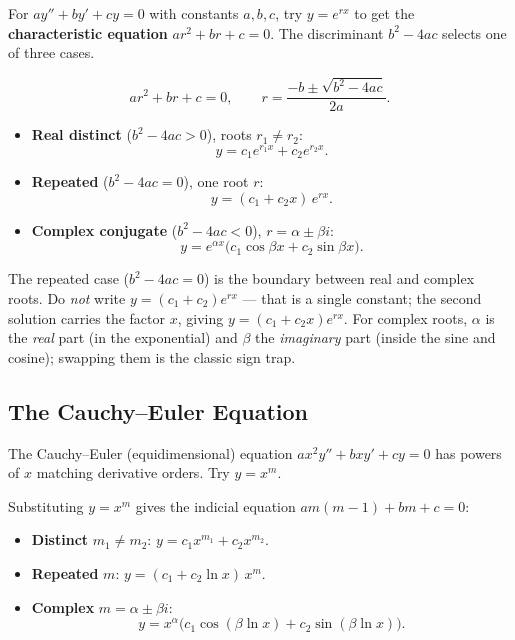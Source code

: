 For $ay'' + by' + cy = 0$ with constants $a,b,c$, try $y=e^{rx}$ to get the
\textbf{characteristic equation} $ar^2 + br + c = 0$. The discriminant
$b^2-4ac$ selects one of three cases.

\begin{formulabox}
\[ ar^2 + br + c = 0, \qquad r = \frac{-b \pm \sqrt{b^2 - 4ac}}{2a}. \]
\begin{itemize}[leftmargin=1.4em, itemsep=3pt]
    \item \textbf{Real distinct} ($b^2-4ac>0$), roots $r_1\neq r_2$:
          \[ y = c_1 e^{r_1 x} + c_2 e^{r_2 x}. \]
    \item \textbf{Repeated} ($b^2-4ac=0$), one root $r$:
          \[ y = (c_1 + c_2 x)\,e^{r x}. \]
    \item \textbf{Complex conjugate} ($b^2-4ac<0$), $r=\alpha\pm\beta i$:
          \[ y = e^{\alpha x}\big(c_1\cos\beta x + c_2\sin\beta x\big). \]
\end{itemize}
\end{formulabox}

\begin{warningbox}
The repeated case ($b^2-4ac=0$) is the boundary between real and complex roots.
Do \emph{not} write $y=(c_1+c_2)e^{rx}$ --- that is a single constant; the second
solution carries the factor $x$, giving $y=(c_1+c_2 x)e^{rx}$. For complex roots,
$\alpha$ is the \emph{real} part (in the exponential) and $\beta$ the
\emph{imaginary} part (inside the sine and cosine); swapping them is the classic
sign trap.
\end{warningbox}

\subsection{The Cauchy--Euler Equation}

The Cauchy--Euler (equidimensional) equation $ax^2y'' + bxy' + cy = 0$ has powers
of $x$ matching derivative orders. Try $y=x^m$.

\begin{formulabox}
Substituting $y=x^m$ gives the indicial equation $am(m-1)+bm+c=0$:
\begin{itemize}[leftmargin=1.4em, itemsep=3pt]
    \item \textbf{Distinct} $m_1\neq m_2$: \quad $y = c_1 x^{m_1} + c_2 x^{m_2}$.
    \item \textbf{Repeated} $m$: \quad $y = (c_1 + c_2\ln x)\,x^{m}$.
    \item \textbf{Complex} $m=\alpha\pm\beta i$:
          \[ y = x^{\alpha}\big(c_1\cos(\beta\ln x) + c_2\sin(\beta\ln x)\big). \]
\end{itemize}
\end{formulabox}

